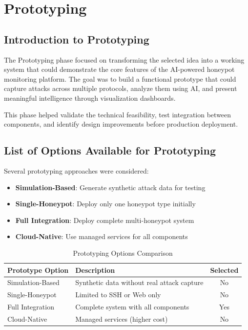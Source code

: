 \documentclass[12pt,a4paper]{report}
\begin{document}
\chapter{Prototyping}
\thispagestyle{mainpages}

\section{Introduction to Prototyping}

The Prototyping phase focused on transforming the selected idea into a working system that could demonstrate the core features of the AI-powered honeypot monitoring platform. The goal was to build a functional prototype that could capture attacks across multiple protocols, analyze them using AI, and present meaningful intelligence through visualization dashboards.

This phase helped validate the technical feasibility, test integration between components, and identify design improvements before production deployment.

\section{List of Options Available for Prototyping}

Several prototyping approaches were considered:

\begin{itemize}
\item \textbf{Simulation-Based}: Generate synthetic attack data for testing
\item \textbf{Single-Honeypot}: Deploy only one honeypot type initially
\item \textbf{Full Integration}: Deploy complete multi-honeypot system
\item \textbf{Cloud-Native}: Use managed services for all components
\end{itemize}

\begin{table}[h]
\centering
\caption{Prototyping Options Comparison}
\label{tab:prototyping_options}
\begin{tabular}{|l|p{7cm}|c|}
\hline
\textbf{Prototype Option} & \textbf{Description} & \textbf{Selected} \\
\hline
Simulation-Based & Synthetic data without real attack capture & No \\
\hline
Single-Honeypot & Limited to SSH or Web only & No \\
\hline
Full Integration & Complete system with all components & Yes \\
\hline
Cloud-Native & Managed services (higher cost) & No \\
\hline
\end{tabular}
\end{table}
\end{document}
